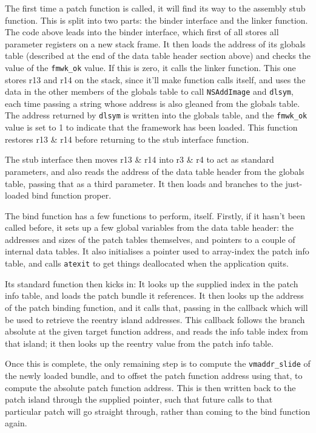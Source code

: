 \documentclass[english]{article}
\begin{document}
The first time a patch function is called, it will find its way to the assembly stub function. This is split into two parts: the binder interface and the linker function. The code above leads into the binder interface, which first of all stores all parameter registers on a new stack frame. It then loads the address of its globals table (described at the end of the data table header section above) and checks the value of the \texttt{fmwk\_ok} value. If this is zero, it calls the linker function. This one stores r13 and r14 on the stack, since it'll make function calls itself, and uses the data in the other members of the globals table to call \texttt{NSAddImage} and \texttt{dlsym}, each time passing a string whose address is also gleaned from the globals table. The address returned by \texttt{dlsym} is written into the globals table, and the \texttt{fmwk\_ok} value is set to 1 to indicate that the framework has been loaded. This function restores r13 \& r14 before returning to the stub interface function.

The stub interface then moves r13 \& r14 into r3 \& r4 to act as standard parameters, and also reads the address of the data table header from the globals table, passing that as a third parameter. It then loads and branches to the just-loaded bind function proper.

The bind function has a few functions to perform, itself. Firstly, if it hasn't been called before, it sets up a few global variables from the data table header: the addresses and sizes of the patch tables themselves, and pointers to a couple of internal data tables. It also initialises a pointer used to array-index the patch info table, and calls \texttt{atexit} to get things deallocated when the application quits.

Its standard function then kicks in: It looks up the supplied index in the patch info table, and loads the patch bundle it references. It then looks up the address of the patch binding function, and it calls that, passing in the callback which will be used to retrieve the reentry island addresses. This callback follows the branch absolute at the given target function address, and reads the info table index from that island; it then looks up the reentry value from the patch info table.

Once this is complete, the only remaining step is to compute the \texttt{vmaddr\_slide} of the newly loaded bundle, and to offset the patch function address using that, to compute the absolute patch function address. This is then written back to the patch island through the supplied pointer, such that future calls to that particular patch will go straight through, rather than coming to the bind function again.
\end{document}
